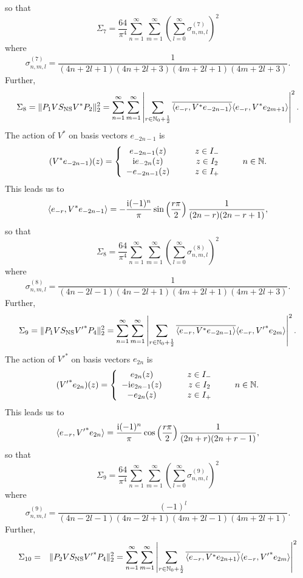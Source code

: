 \documentclass[10pt,a4paper]{article}
\begin{document}
\begin{appendix}
so that
\[ \Sigma_7 = \frac{64}{\pi^4} \sum_{n=1}^\infty
\sum_{m=1}^\infty  \left( \sum_{l=0}^\infty
\sigma_{n,m,l}^{(7)} \right)^2 \]
where
\[ \sigma_{n,m,l}^{(7)} = \frac{1}{(4n+2l+1)(4n+2l+3)
(4m+2l+1)(4m+2l+3)}. \]
Further,
\[ \Sigma_8 = \| P_1 V S_{\rm NS} V^* P_2 \|_2^2
= \sum_{n=1}^\infty \sum_{m=1}^\infty \left|
\sum_{r \in \mathbb{N}_0 +\frac{1}{2}}
\overline{ \langle e_{-r}, V^* e_{-2n-1} \rangle }
\langle e_{-r}, V^* e_{2m+1} \rangle \right|^2 .\]
The action of $V^*$ on basis vectors $e_{-2n-1}$ is
\[ (V^*e_{-2n-1})(z) = \left\{ \begin{array}{cc} e_{-2n-1}(z) &
\qquad z \in I_- \\
{\rm i} e_{-2n}(z) & \qquad z \in I_2 \\ -e_{-2n-1}(z) & \qquad z
\in I_+ \end{array} \right. \qquad n\in\mathbb{N}.\]
This leads us to
\[ \langle e_{-r}, V^*  e_{-2n-1} \rangle =  -\frac{{\rm i} (-1)^n}{\pi}
\sin\left(\frac{r\pi}{2}\right)\frac{1}{(2n-r)(2n-r+1)},\]
so that
\[ \Sigma_8 = \frac{64}{\pi^4} \sum_{n=1}^\infty
\sum_{m=1}^\infty  \left( \sum_{l=0}^\infty
\sigma_{n,m,l}^{(8)} \right)^2 \]
where
\[ \sigma_{n,m,l}^{(8)} = \frac{1}{(4n-2l-1)(4n-2l+1)
(4m+2l+1)(4m+2l+3)}. \]
Further,
\[ \Sigma_9 = \| P_1 V S_{\rm NS} {V'}^* P_4 \|_2^2
= \sum_{n=1}^\infty \sum_{m=1}^\infty \left|
\sum_{r \in \mathbb{N}_0 +\frac{1}{2}}
\overline{ \langle e_{-r}, V^* e_{-2n-1} \rangle }
\langle e_{-r}, {V'}^* e_{2m} \rangle \right|^2 .\]
The action of ${V'}^*$ on basis vectors $e_{2n}$ is
\[ ({V'}^*e_{2n})(z) = \left\{ \begin{array}{cc} e_{2n}(z) &
\qquad z \in I_- \\
-{\rm i} e_{2n-1}(z) & \qquad z \in I_2 \\ -e_{2n}(z) & \qquad z
\in I_+ \end{array} \right. \qquad n\in\mathbb{N}.\]
This leads us to
\[ \langle e_{-r}, {V'}^*  e_{2n} \rangle =  \frac{{\rm i} (-1)^n}{\pi}
\cos\left(\frac{r\pi}{2}\right)\frac{1}{(2n+r)(2n+r-1)},\]
so that
\[ \Sigma_9 = \frac{64}{\pi^4} \sum_{n=1}^\infty
\sum_{m=1}^\infty  \left( \sum_{l=0}^\infty
\sigma_{n,m,l}^{(9)} \right)^2 \]
where
\[ \sigma_{n,m,l}^{(9)} = \frac{(-1)^l}{(4n-2l-1)(4n-2l+1)
(4m+2l-1)(4m+2l+1)}. \]
Further,
\begin{eqnarray*}
\Sigma_{10} &=& \| P_2 V S_{\rm NS} {V'}^* P_4 \|_2^2
= \sum_{n=1}^\infty \sum_{m=1}^\infty \left|
\sum_{r \in \mathbb{N}_0 +\frac{1}{2}}
\overline{ \langle e_{-r}, V^* e_{2n+1} \rangle }
\langle e_{-r}, {V'}^* e_{2m} \rangle \right|^2 \\

\end{eqnarray*}
\end{appendix}
\end{document}

